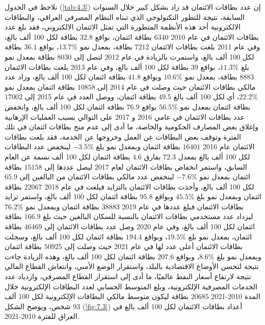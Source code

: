 \documentclass[10pt,a4paper]{report}
\begin{document}
\begin{doublespacing}
نلاحظ في الجدول (\ref{tab:4.3}) إن عدد بطاقات الائتمان قد زاد بشكل كبير خلال السنوات السابقة، نتيجة للتطور التكنولوجي الذي تبناه النظام المصرفي العراقي، والبطاقات الالكترونية أحد هذه الأنظمة المتطورة التي تمثل الائتمان الالكتروني، فقد بلغ عدد بطاقات الائتمان في عام 2010 \( 6340 \) بطاقة ائتمان، بواقع \( 32.8 \) بطاقة لكل 100 ألف بالغ، وفي عام 2011 بلغت بطاقات الائتمان \( 7212 \) بطاقة، بمعدل نمو \( 13.7\% \)، بواقع \( 36.1 \) بطاقة لكل 100 ألف بالغ، واستمرت بالزيادة في عام 2012 لتصل إلى \( 8030 \) بطاقة بمعدل نمو بلغ \( 11.3\% \)، بواقع \( 39 \) بطاقة لكل 100 ألف بالغ، وفي عام 2013 بلغت بطاقات الائتمان \( 8883 \) بطاقة، بمعدل نمو \( 10.6\% \) وبواقع \( 41.8 \) بطاقة ائتمان لكل 100 ألف بالغ، وزاد عدد مالكي بطاقات الائتمان حيث وصلت في عام 2014 إلى \( 10858 \) بطاقة ائتمان بمعدل نمو \( 22.2\% \)، أي لكل 100 ألف بالغ \( 49.5 \) بطاقة ائتمان، ووصل العدد في عام 2015 إلى \( 17002 \) بطاقة ائتمان بمعدل نمو \( 56.5\% \) بواقع \( 76.9 \) بطاقة ائتمان لكل 100 ألف بالغ، وانخفض عدد بطاقات الائتمان في عامي 2016 و 2017 على التوالي بسبب العمليات الإرهابية وإغلاق بعض المصارف الحكومية والخاصة، ما أدى إلى عدم منح بطاقات ائتمان في تلك الفترة وتوقف بعض البطاقات عن العمل وخروجها عن الخدمة، فقد بلغت بطاقات الائتمان عام 2016 \( 16401 \) بطاقة ائتمان وبمعدل نمو بلغ \( -3.5\% \) لينخفض عدد البطاقات لكل 100 ألف بالغ بمعدل \( 72.3 \) بفارق \( 4.6 \) بطاقة ائتمان لكل 100 ألف نسمة عن العام السابق، واستمر انخفاض بطاقات الائتمان لعام 2017 ليصل عددها إلى \( 15158 \) بطاقة ائتمان بمعدل نمو \( -7.6\% \) لينخفض عدد مالكي بطاقات الائتمان من البالغين إلى \( 65.9 \) لكل 100 ألف بالغ، وأخذت بطاقات الائتمان بالتزايد فبلغت في عام 2018 \( 22067 \) بطاقة ائتمان وبمعدل نمو بلغ \( 45.5\% \) وبواقع \( 95.8 \) بطاقة ائتمان لكل 100 ألف بالغ، واستمر تزايد بطاقات الائتمان فبلغ عددها في عام 2019 \( 38883 \) بطاقة ائتمان وبمعدل نمو \( 76.2\% \) ليزداد عدد مستخدمي بطاقات الائتمان بالنسبة للسكان البالغين حيث بلغ \( 166.9 \) بطاقة ائتمان لكل 100 ألف بالغ، وفي عام 2020 وصل عدد بطاقات الائتمان إلى \( 46469 \) بطاقة ائتمان، بمعدل نمو بلغ \( 19.5\% \)، وبواقع \( 194.4 \) بطاقة ائتمان لكل 100 ألف بالغ، وسجلت بطاقات الائتمان أعلى عدد لها في عام 2021 حيث وصلت إلى \( 50925 \) بطاقة ائتمان وبمعدل نمو بلغ \( 8.6\% \)، وبواقع \( 207.6 \) بطاقة ائتمان لكل 100 ألف بالغ، وهذه الزيادة جاءت نتيجة لتحسن الأوضاع الاقتصادية بالبلد، واستقرار الوضع الأمني، وانتعاش القطاع المالي نتيجة لارتفاع أسعار النفط عالميًا، ما أدى إلى استقرار القطاع المصرفي، وازدياد عدد الخدمات المصرفية الإلكترونية، وبلغ المتوسط الحسابي لعدد البطاقات الإلكترونية خلال المدة 2010-2021 \( 20685 \) بطاقة ليكون متوسط مالكي البطاقات الإلكترونية لكل 100 ألف \( 93 \) شخص، ويوضح الشكل (\ref{fig:7.3}) أعداد بطاقات الائتمان لكل 100 ألف بالغ في العراق للفترة 2010-2021.

\end{doublespacing}
\end{document}
